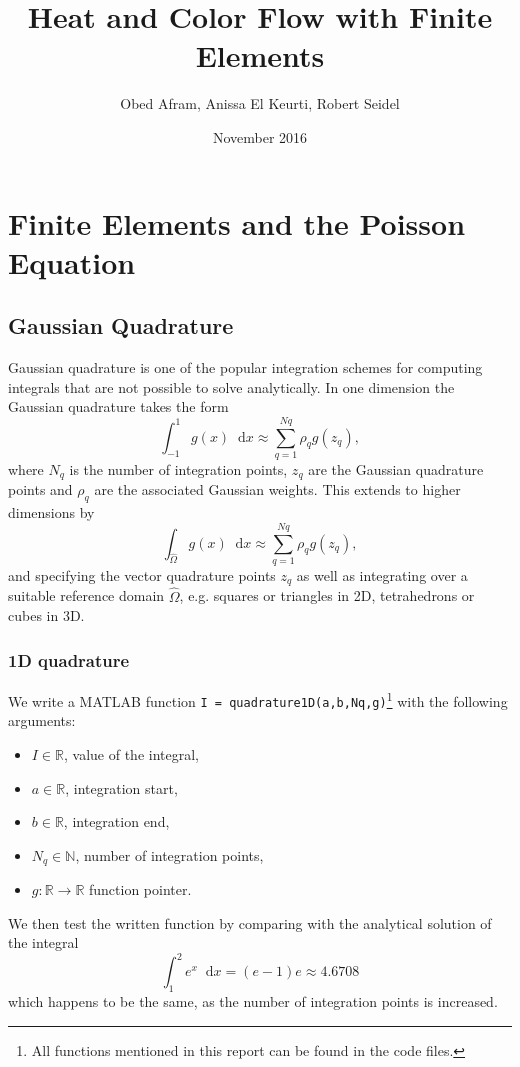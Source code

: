 \documentclass{report}
\renewcommand*\d{\mathop{}\!\mathrm{d}}
\begin{document}

\lstset{language=Matlab}

\title{Heat and Color Flow with Finite Elements}
\author{Obed Afram, Anissa El Keurti, Robert Seidel}
\date{November 2016}
\maketitle

\tableofcontents

\listoftables

\listoffigures

\chapter{Finite Elements and the Poisson Equation}


\section{Gaussian Quadrature}

Gaussian quadrature is one of the popular integration schemes for computing integrals that are not possible to solve analytically. In one dimension the Gaussian quadrature takes the form
\begin{equation}
	\int_{-1}^{1} g(x)\d x\approx\sum_{q=1}^{Nq} \rho_q g(z_q),
\end{equation}
where $N_q$ is the number of integration points, $z_q$ are the Gaussian quadrature points and $\rho_q$ are the associated Gaussian weights. This extends to higher dimensions by
\begin{equation}
	\int_{\hat{\Omega}} g({x}) \d x\approx\sum_{q=1}^{Nq} \rho_q g(z_q),
\end{equation}
and specifying the vector quadrature points $z_q$ as well as integrating over a suitable reference domain $\hat{\Omega}$, e.g. squares or triangles in 2D, tetrahedrons or cubes in 3D.


\subsection{1D quadrature}
We write a MATLAB function \texttt{I = quadrature1D(a,b,Nq,g)}\footnote{All functions mentioned in this report can be found in the code files.} with the following arguments:
\begin{itemize}
	\item $I\in\mathbb{R}$, value of the integral,
	\item $a\in\mathbb{R}$, integration start,
	\item $b\in\mathbb{R}$, integration end,
	\item $N_q \in\mathbb{N}$, number of integration points,
	\item $g: \mathbb{R} \rightarrow \mathbb{R}$ function pointer.
\end{itemize}
We then test the written function by comparing with the analytical solution of the integral
\begin{equation}
	\int_1^2 e^x \d x = (e-1)e \approx 4.6708
\end{equation}
which happens to be the same, as the number of integration points is increased.
\end{document}
